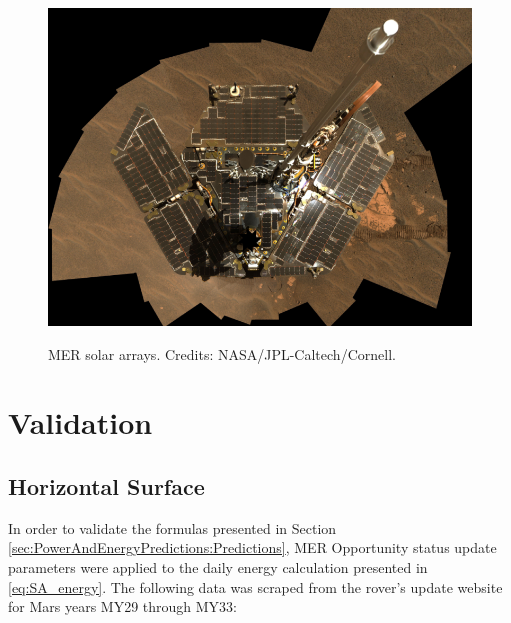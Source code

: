 \begin{figure}[H]
  \centering
  \hypersetup{linkcolor=captionTextColor}
  \includegraphics[width=0.8\linewidth]{sections/power-and-energy-predictions/images/mer-solar-arrays.png}\\
  \caption[MER solar arrays]
          {MER solar arrays. Credits: NASA/JPL-Caltech/Cornell.}
  \label{fig:image:mer-solar-arrays}
\end{figure}


\section{Validation}
\label{sec:PowerAndEnergyPredictions:Validation}


\subsection{Horizontal Surface}
\label{sec:PowerAndEnergyPredictions:Validation:HorizontalSurface}

In order to validate the formulas presented in Section \ref{sec:PowerAndEnergyPredictions:Predictions}, MER Opportunity status update parameters were applied to the daily energy calculation presented in \ref{eq:SA_energy}. The following data was scraped from the rover's update website for Mars years MY29 through MY33:

